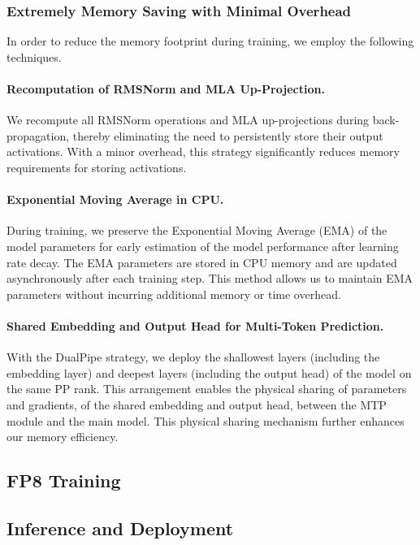 \documentclass[11pt, a4paper, logo, copyright, nonumbering]{deepseek}
\begin{document}
\begin{CJK*}{UTF8}{gbsn}
\subsubsection{Extremely Memory Saving with Minimal Overhead}

In order to reduce the memory footprint during training, we employ the following techniques.

\paragraph{Recomputation of RMSNorm and MLA Up-Projection.}

We recompute all RMSNorm operations and MLA up-projections during back-propagation, thereby eliminating the need to persistently store their output activations.
With a minor overhead, this strategy significantly reduces memory requirements for storing activations. 

\paragraph{Exponential Moving Average in CPU.}
During training, we preserve the Exponential Moving Average (EMA) of the model parameters for early estimation of the model performance after learning rate decay.
The EMA parameters are stored in CPU memory and are updated asynchronously after each training step. 
This method allows us to maintain EMA parameters without incurring additional memory or time overhead.

\paragraph{Shared Embedding and Output Head for Multi-Token Prediction.}
With the DualPipe strategy, we deploy the shallowest layers (including the embedding layer) and deepest layers (including the output head) of the model on the same PP rank. 
This arrangement enables the physical sharing of parameters and gradients, of the shared embedding and output head, between the MTP module and the main model.
This physical sharing mechanism further enhances our memory efficiency. 

\subsection{FP8 Training}



\subsection{Inference and Deployment}
\label{sec:inference_deployment}


\end{CJK*}
\end{document}
